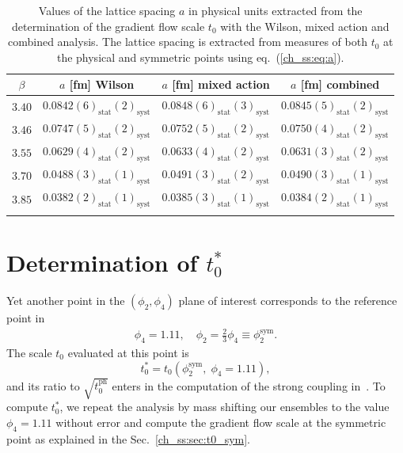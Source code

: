 \begin{longtable}{c c c c}
\label{ch_ss:tab:a}
$\beta$ & $a$ [fm] Wilson & $a$ [fm] mixed action & $a$ [fm] combined \\
\toprule
$3.40$ & $0.0842(6)_{\textrm{stat}}(2)_{\textrm{syst}}$ & $0.0848(6)_{\textrm{stat}}(3)_{\textrm{syst}}$ & $0.0845(5)_{\textrm{stat}}(2)_{\textrm{syst}}$ \\
$3.46$ & $0.0747(5)_{\textrm{stat}}(2)_{\textrm{syst}}$ & $0.0752(5)_{\textrm{stat}}(2)_{\textrm{syst}}$ & $0.0750(4)_{\textrm{stat}}(2)_{\textrm{syst}}$ \\
$3.55$ & $0.0629(4)_{\textrm{stat}}(2)_{\textrm{syst}}$ & $0.0633(4)_{\textrm{stat}}(2)_{\textrm{syst}}$ & $0.0631(3)_{\textrm{stat}}(2)_{\textrm{syst}}$ \\
$3.70$ & $0.0488(3)_{\textrm{stat}}(1)_{\textrm{syst}}$ & $0.0491(3)_{\textrm{stat}}(2)_{\textrm{syst}}$ & $0.0490(3)_{\textrm{stat}}(1)_{\textrm{syst}}$ \\
$3.85$ & $0.0382(2)_{\textrm{stat}}(1)_{\textrm{syst}}$ & $0.0385(3)_{\textrm{stat}}(1)_{\textrm{syst}}$ & $0.0384(2)_{\textrm{stat}}(1)_{\textrm{syst}}$ \\
\bottomrule
\caption{Values of the lattice spacing $a$ in physical units extracted from the determination of the gradient flow scale $t_0$ with the Wilson, mixed action and combined analysis. The lattice spacing is extracted from measures of both $t_0$ at the physical and symmetric points using eq.~(\ref{ch_ss:eq:a}).}
\end{longtable}

\section{Determination of $t_0^*$}

Yet another point in the $(\phi_2,\phi_4)$ plane of interest corresponds to the reference point in~\citep{Bruno:2016plf}
\begin{gather}
\phi_4=1.11, \quad \phi_2=\frac{2}{3}\phi_4\equiv\phi_2^{\textrm{sym}}.
\end{gather}
The scale $t_0$ evaluated at this point is
\begin{equation}
t_0^*=t_0\left(\phi_2^{\textrm{sym}},\;\phi_4=1.11\right),
\end{equation}
and its ratio to $\sqrt{t_0^{\textrm{ph}}}$ enters in the computation of the strong coupling in~\citep{DallaBrida:2022eua}. To compute $t_0^{*}$, we repeat the analysis by mass shifting our ensembles to the value $\phi_4=1.11$ without error and compute the gradient flow scale at the symmetric point as explained in the Sec.~\ref{ch_ss:sec:t0_sym}.

